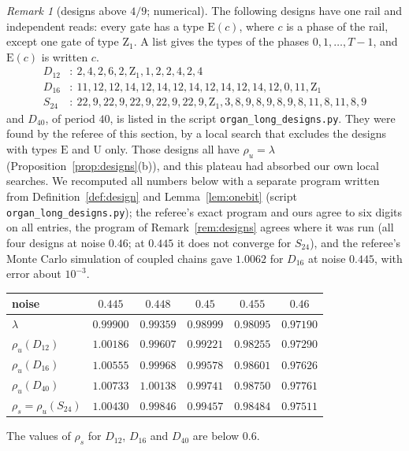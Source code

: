 \documentclass[11pt]{amsart}
\theoremstyle{definition}
\theoremstyle{remark}
\newtheorem{remark}[theorem]{Remark}
\begin{document}
\begin{remark}[designs above $4/9$; numerical]\label{rem:beyond}
The following designs have one rail and independent reads: every gate has a type $\mathrm E(c)$,
where $c$ is a phase of the rail, except one gate of type $\mathrm Z_1$. A list gives the types of
the phases $0,1,\dots,T-1$, and $\mathrm E(c)$ is written $c$.
\begin{align*}
D_{12}&:\ 2,4,2,6,2,\mathrm Z_1,1,2,2,4,2,4\\
D_{16}&:\ 11,12,12,14,12,14,12,14,12,14,12,14,12,0,11,\mathrm Z_1\\
S_{24}&:\ 22,9,22,9,22,9,22,9,22,9,\mathrm Z_1,3,8,9,8,9,8,9,8,11,8,11,8,9
\end{align*}
and $D_{40}$, of period $40$, is listed in the script \texttt{organ\_long\_designs.py}. They were
found by the referee of this section, by a local search that excludes the designs with types
$\mathrm E$ and $\mathrm U$ only. Those designs all have $\rho_u=\lambda$
(Proposition~\ref{prop:designs}(b)), and this plateau had absorbed our own local searches. We
recomputed all numbers below with a separate program written from
Definition~\ref{def:design} and Lemma~\ref{lem:onebit} (script \texttt{organ\_long\_designs.py});
the referee's exact program and ours agree to six digits on all entries, the program of
Remark~\ref{rem:designs} agrees where it was run (all four designs at noise $0.46$; at $0.445$ it
does not converge for $S_{24}$), and the referee's Monte Carlo simulation of coupled chains gave
$1.0062$ for $D_{16}$ at noise $0.445$, with error about $10^{-3}$.
\begin{center}
\begin{tabular}{lccccc}
\toprule
noise & $0.445$ & $0.448$ & $0.45$ & $0.455$ & $0.46$\\
\midrule
$\lambda$ & $0.99900$ & $0.99359$ & $0.98999$ & $0.98095$ & $0.97190$\\
$\rho_u(D_{12})$ & $1.00186$ & $0.99607$ & $0.99221$ & $0.98255$ & $0.97290$\\
$\rho_u(D_{16})$ & $1.00555$ & $0.99968$ & $0.99578$ & $0.98601$ & $0.97626$\\
$\rho_u(D_{40})$ & $1.00733$ & $1.00138$ & $0.99741$ & $0.98750$ & $0.97761$\\
$\rho_s=\rho_u(S_{24})$ & $1.00430$ & $0.99846$ & $0.99457$ & $0.98484$ & $0.97511$\\
\bottomrule
\end{tabular}
\end{center}
The values of $\rho_s$ for $D_{12}$, $D_{16}$ and $D_{40}$ are below $0.6$.

\end{remark}
\end{document}
